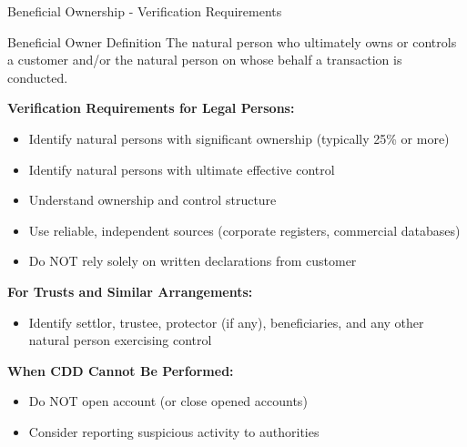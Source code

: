 \documentclass[11pt,a4paper]{beamer}
\begin{document}
	\begin{frame}{Beneficial Ownership - Verification Requirements}
		\begin{block}{Beneficial Owner Definition}
			The natural person who ultimately owns or controls a customer and/or the natural person on whose behalf a transaction is conducted.
		\end{block}
		\textbf{Verification Requirements for Legal Persons:}
		\begin{itemize}
			\item Identify natural persons with significant ownership (typically 25\% or more)
			\item Identify natural persons with ultimate effective control
			\item Understand ownership and control structure
			\item Use reliable, independent sources (corporate registers, commercial databases)
			\item Do NOT rely solely on written declarations from customer
		\end{itemize}
		\textbf{For Trusts and Similar Arrangements:}
		\begin{itemize}
			\item Identify settlor, trustee, protector (if any), beneficiaries, and any other natural person exercising control
		\end{itemize}
		\textbf{When CDD Cannot Be Performed:}
		\begin{itemize}
			\item Do NOT open account (or close opened accounts)
			\item Consider reporting suspicious activity to authorities
		\end{itemize}
	\end{frame}
	
\end{document}
